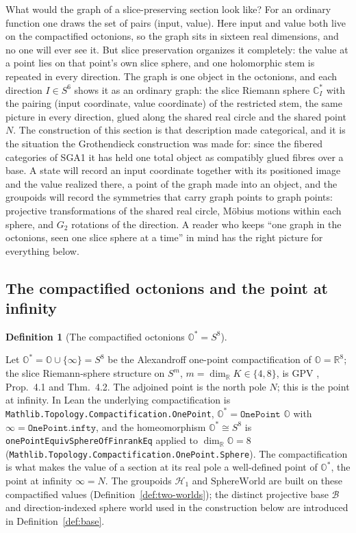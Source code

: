 \documentclass[11pt]{article}
\newcommand{\OO}{\mathbb{O}}
\newcommand{\CC}{\mathbb{C}}
\newcommand{\RR}{\mathbb{R}}
\providecommand{\SphereWorld}{\mathrm{SphereWorld}}
\providecommand{\lean}[1]{}
\theoremstyle{plain}
\theoremstyle{definition}
\newtheorem{definition}[theorem]{Definition}
\theoremstyle{remark}
\begin{document}
What would the graph of a slice-preserving section look like? For an ordinary function one
draws the set of pairs (input, value). Here input and value both live on the compactified
octonions, so the graph sits in sixteen real dimensions, and no one will ever see it. But
slice preservation organizes it completely: the value at a point lies on that point's own
slice sphere, and one holomorphic stem is repeated in every direction. The graph is one
object in the octonions, and each direction $I\in S^6$ shows it as an ordinary graph: the
slice Riemann sphere $\CC_I^{*}$ with the pairing (input coordinate, value coordinate) of
the restricted stem, the same picture in every direction, glued along the shared real
circle and the shared point $N$. The construction of this section is that description made
categorical, and it is the situation the Grothendieck construction was made for: since the
fibered categories of SGA1 it has held one total object as compatibly glued fibres over a
base. A state will record an input coordinate together with its positioned image and the
value realized there, a point of the graph made into an object, and the groupoids will
record the symmetries that carry graph points to graph points: projective transformations
of the shared real circle, M\"obius motions within each sphere, and $G_2$ rotations of the
direction. A reader who keeps ``one graph in the octonions, seen one slice sphere at a
time'' in mind has the right picture for everything below.

\subsection*{The compactified octonions and the point at infinity}

\begin{definition}[The compactified octonions $\OO^{*}=S^8$]\label{def:carrier}
\lean{Octonion}
Let $\OO^{*}=\OO\cup\{\infty\}=S^8$ be the Alexandroff one-point compactification of $\OO=\RR^8$;
the slice Riemann-sphere structure on $S^m$, $m=\dim_{\RR}K\in\{4,8\}$, is GPV \cite{VS},
Prop.~4.1 and Thm.~4.2. The adjoined point is the north pole $N$; this is the point at
infinity. In Lean the underlying compactification is
\texttt{Mathlib.\-Topology.\-Compactification.\-OnePoint}, $\OO^{*}=\texttt{OnePoint }\OO$ with
$\infty=\texttt{OnePoint.infty}$, and the homeomorphism $\OO^{*}\cong S^8$ is
\texttt{onePoint\-Equiv\-Sphere\-Of\-Finrank\-Eq} applied to $\dim_{\RR}\OO=8$
(\texttt{Mathlib.\-Topology.\-Compactification.\-OnePoint.\-Sphere}). The compactification is what makes
the value of a section at its real pole a well-defined point of $\OO^{*}$, the point at
infinity $\infty=N$. The groupoids $\mathcal H_1$ and $\SphereWorld$ are built on
these compactified values (Definition~\ref{def:two-worlds}); the distinct projective base
$\mathcal B$ and direction-indexed sphere world used in the construction below are introduced in
Definition~\ref{def:base}.
\end{definition}
\end{document}
